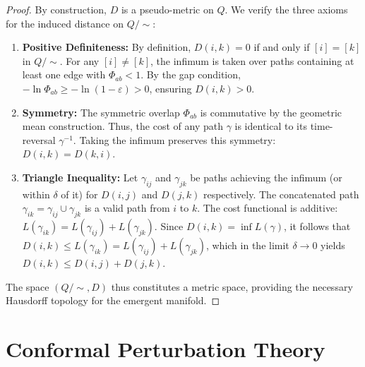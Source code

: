 \documentclass[11pt,template]{article}
\begin{document}
\begin{proof}
By construction, $D$ is a pseudo-metric on $Q$. We verify the three axioms for the induced distance on $Q/\sim$:
\begin{enumerate}
    \item \textbf{Positive Definiteness:} By definition, $D(i,k) = 0$ if and only if $[i] = [k]$ in $Q/\sim$. For any $[i] \neq [k]$, the infimum is taken over paths containing at least one edge with $\Phi_{ab} < 1$. By the gap condition, $-\ln \Phi_{ab} \ge -\ln(1-\varepsilon) > 0$, ensuring $D(i,k) > 0$.
    \item \textbf{Symmetry:} The symmetric overlap $\Phi_{ab}$ is commutative by the geometric mean construction. Thus, the cost of any path $\gamma$ is identical to its time-reversal $\gamma^{-1}$. Taking the infimum preserves this symmetry: $D(i,k) = D(k,i)$.
    \item \textbf{Triangle Inequality:} Let $\gamma_{ij}$ and $\gamma_{jk}$ be paths achieving the infimum (or within $\delta$ of it) for $D(i,j)$ and $D(j,k)$ respectively. The concatenated path $\gamma_{ik} = \gamma_{ij} \cup \gamma_{jk}$ is a valid path from $i$ to $k$. The cost functional is additive: $L(\gamma_{ik}) = L(\gamma_{ij}) + L(\gamma_{jk})$. Since $D(i,k) = \inf L(\gamma)$, it follows that $D(i,k) \le L(\gamma_{ik}) = L(\gamma_{ij}) + L(\gamma_{jk})$, which in the limit $\delta \to 0$ yields $D(i,k) \le D(i,j) + D(j,k)$.
\end{enumerate}
The space $(Q/\sim, D)$ thus constitutes a metric space, providing the necessary Hausdorff topology for the emergent manifold.
\end{proof}

\section{Conformal Perturbation Theory}
\end{document}
